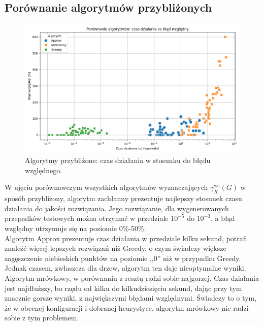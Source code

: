 \subsection{Porównanie algorytmów przybliżonych}

\begin{figure}[H]
    \centering
    \includegraphics[width=\textwidth]{assets/plots_approx/alorithms.png}
    \caption{Algorytmy przybliżone: czas działania w stosunku do błędu względnego.}
    \label{fig:approxPlot}
\end{figure}

W ujęciu porównawczym wszystkich algorytmów wyznaczających $\gamma^{\text{wc}}_R(G)$ w sposób przybliżony, algorytm zachłanny prezentuje najlepszy stosunek czasu działania do jakości rozwiązania. Jego rozwiązanie, dla wygenerowanych przepadków testowych można otrzymać w przedziale $10^{-5}$ do $10^{-3}$, a błąd względny utrzymuje się na poziomie 0\%-50\%.\\
Algorytm Approx prezentuje czas działania w przedziale kilku sekund, potrafi znaleźć więcej lepszych rozwiązań niż Greedy, o czym świadczy większe zagęszczenie niebieskich punktów na poziomie ,,0'' niż w przypadku Greedy. Jednak czasem, zwłaszcza dla drzew, algorytm ten daje nieoptymalne wyniki.\\
Algorytm mrówkowy, w porównaniu z resztą radzi sobie najgorzej. Czas działania jest najdłuższy, bo rzędu od kilku do kilkudziesięciu sekund, dając przy tym znacznie gorsze wyniki, z największymi błędami względnymi. Świadczy to o tym, że w obecnej konfiguracji i dobranej heurystyce, algorytm mrówkowy nie radzi sobie z tym problemem.